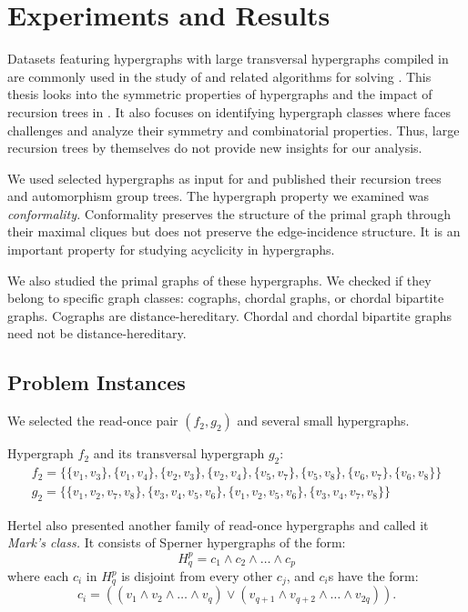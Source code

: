 \section{Experiments and Results}

Datasets featuring hypergraphs with large transversal hypergraphs compiled in \cite{Uno24} are commonly used in the study of \FKA{} and related algorithms for solving \TransHyp{} \cite{Tak08}. This thesis looks into the symmetric properties of hypergraphs and the impact of recursion trees in \FKA. It also focuses on identifying hypergraph classes where \FKA{} faces challenges and analyze their symmetry and combinatorial properties. Thus, large recursion trees by themselves do not provide new insights for our analysis.

We used selected hypergraphs as input for \FKA{} and published their recursion trees and automorphism group trees. The hypergraph property we examined was \emph{conformality.} Conformality preserves the structure of the primal graph through their maximal cliques but does not preserve the edge-incidence structure. It is an important property for studying acyclicity in hypergraphs.

We also studied the primal graphs of these hypergraphs. We checked if they belong to specific graph classes: cographs, chordal graphs, or chordal bipartite graphs. Cographs are distance-hereditary. Chordal and chordal bipartite graphs need not be distance-hereditary.

\subsection{Problem Instances}

We selected the read-once pair $(f_2,g_2)$ and several small hypergraphs.

Hypergraph $f_2$ and its transversal hypergraph $g_2$:
\begin{gather*}
f_2=\{\{v_1,v_3\},\{v_1,v_4\},\{v_2,v_3\},\{v_2,v_4\},\{v_5,v_7\},\{v_5,v_8\},\{v_6,v_7\},\{v_6,v_8\}\}\\[4pt]
g_2=\{\{v_1,v_2,v_7,v_8\},\{v_3,v_4,v_5,v_6\},\{v_1,v_2,v_5,v_6\},\{v_3,v_4,v_7,v_8\}\}
\end{gather*}

Hertel also presented another family of read-once hypergraphs and called it \emph{Mark's class.} It consists of Sperner hypergraphs of the form:
\[
H_q^p=c_1\wedge c_2\wedge\dots\wedge c_p
\]
where each $c_i$ in $H_q^p$ is disjoint from every other $c_j$, and $c_i$s have the form:
\[
c_i=((v_1\wedge v_2\wedge\dots\wedge v_q)\vee(v_{q+1}\wedge v_{q+2}\wedge\dots\wedge v_{2q})).
\]

